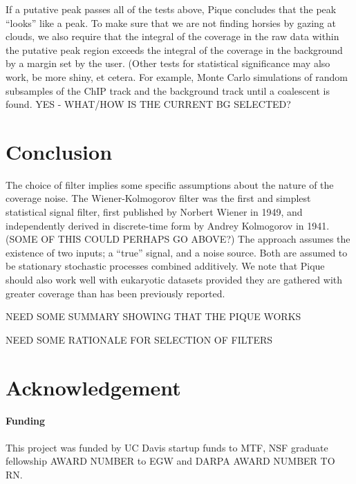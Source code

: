 \documentclass{bioinfo}
\begin{document}
\noindent If a putative peak passes all of the tests above, Pique
concludes that the peak ``looks'' like a peak. To make sure that we
are not finding horsies by gazing at clouds, we also require that the
integral of the coverage in the raw data within the putative peak
region exceeds the integral of the coverage in the background by a
margin set by the user. (Other tests for statistical significance may
also work, be more shiny, et cetera. For example, Monte Carlo
simulations of random subsamples of the ChIP track and the background
track until a coalescent is found. YES - WHAT/HOW IS THE CURRENT BG
SELECTED?


\section{Conclusion}

The choice of filter implies some specific assumptions about the
nature of the coverage noise. The Wiener-Kolmogorov filter was the
first and simplest statistical signal filter, first published by
Norbert Wiener in 1949, and independently derived in discrete-time
form by Andrey Kolmogorov in 1941. (SOME OF THIS COULD PERHAPS GO
ABOVE?) The approach assumes the existence of two inputs; a ``true''
signal, and a noise source. Both are assumed to be stationary
stochastic processes combined additively. We note that Pique should
also work well with eukaryotic datasets provided they are gathered
with greater coverage than has been previously reported.

NEED SOME SUMMARY SHOWING THAT THE PIQUE WORKS

NEED SOME RATIONALE FOR SELECTION OF FILTERS

\section*{Acknowledgement}
\paragraph{Funding\textcolon} 

This project was funded by UC Davis startup funds to MTF, NSF graduate
fellowship AWARD NUMBER to EGW and DARPA AWARD NUMBER TO RN.

%
%
%
%





\end{document}

